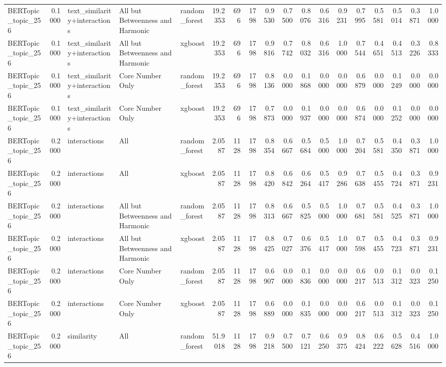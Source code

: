 \begin{tabular}{lrlllrrrrrrrrrrrrr}
BERTopic_topic_256 & 0.1000 & text_similarity+interactions & All but Betweenness and Harmonic & random_forest & 19.2353 & 696 & 1798 & 0.9530 & 0.7500 & 0.8076 & 0.6316 & 0.9231 & 0.7995 & 0.5581 & 0.5014 & 0.3871 & 1.0000 \\
BERTopic_topic_256 & 0.1000 & text_similarity+interactions & All but Betweenness and Harmonic & xgboost & 19.2353 & 696 & 1798 & 0.9816 & 0.7742 & 0.8032 & 0.6316 & 1.0000 & 0.7544 & 0.4651 & 0.4513 & 0.3226 & 0.8333 \\
BERTopic_topic_256 & 0.1000 & text_similarity+interactions & Core Number Only & random_forest & 19.2353 & 696 & 1798 & 0.8136 & 0.0000 & 0.1868 & 0.0000 & 0.0000 & 0.6879 & 0.0000 & 0.1249 & 0.0000 & 0.0000 \\
BERTopic_topic_256 & 0.1000 & text_similarity+interactions & Core Number Only & xgboost & 19.2353 & 696 & 1798 & 0.7873 & 0.0000 & 0.1937 & 0.0000 & 0.0000 & 0.6874 & 0.0000 & 0.1252 & 0.0000 & 0.0000 \\
BERTopic_topic_256 & 0.2000 & interactions & All & random_forest & 2.0587 & 1128 & 1798 & 0.8354 & 0.6667 & 0.5684 & 0.5000 & 1.0000 & 0.7204 & 0.5581 & 0.4350 & 0.3871 & 1.0000 \\
BERTopic_topic_256 & 0.2000 & interactions & All & xgboost & 2.0587 & 1128 & 1798 & 0.8420 & 0.6842 & 0.6264 & 0.5417 & 0.9286 & 0.7638 & 0.5455 & 0.4724 & 0.3871 & 0.9231 \\
BERTopic_topic_256 & 0.2000 & interactions & All but Betweenness and Harmonic & random_forest & 2.0587 & 1128 & 1798 & 0.8313 & 0.6667 & 0.5825 & 0.5000 & 1.0000 & 0.7681 & 0.5581 & 0.4525 & 0.3871 & 1.0000 \\
BERTopic_topic_256 & 0.2000 & interactions & All but Betweenness and Harmonic & xgboost & 2.0587 & 1128 & 1798 & 0.8425 & 0.7027 & 0.6376 & 0.5417 & 1.0000 & 0.7598 & 0.5455 & 0.4723 & 0.3871 & 0.9231 \\
BERTopic_topic_256 & 0.2000 & interactions & Core Number Only & random_forest & 2.0587 & 1128 & 1798 & 0.6907 & 0.0000 & 0.1836 & 0.0000 & 0.0000 & 0.6217 & 0.0513 & 0.1312 & 0.0323 & 0.1250 \\
BERTopic_topic_256 & 0.2000 & interactions & Core Number Only & xgboost & 2.0587 & 1128 & 1798 & 0.6889 & 0.0000 & 0.1835 & 0.0000 & 0.0000 & 0.6217 & 0.0513 & 0.1312 & 0.0323 & 0.1250 \\
BERTopic_topic_256 & 0.2000 & similarity & All & random_forest & 51.9018 & 1128 & 1798 & 0.9218 & 0.7500 & 0.7121 & 0.6250 & 0.9375 & 0.8424 & 0.6222 & 0.5628 & 0.4516 & 1.0000 \\

\end{tabular}
